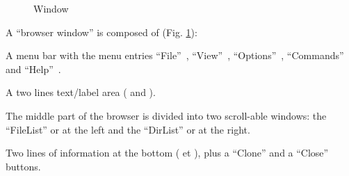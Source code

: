 \begin{figure}[tb]
\vspace{-.5cm}
\vspace{-.5cm}
\vspace{-4pt}
\caption{\KUIPMotif{} \MB{} Window}
\label{ref:FIGPKMF9}
\end{figure}

A ``browser window'' is composed of (Fig. \ref{ref:FIGPKMF9}):
\vspace{-.5\baselineskip}
\begin{UL}
\item
A menu bar with the menu entries ``File''~, ``View''~, 
``Options''~, ``Commands''~ and ``Help''~.
\item
A two lines text/label area ( and ).
\item
The middle part of the browser is divided into two scroll-able windows:
the ``FileList'' or \BW{}  at the left and the ``DirList'' or 
\OW{}  at the right.
\item
Two lines of information at the bottom ( et ), plus a 
``Clone''  and a ``Close''  buttons.
\end{UL}

